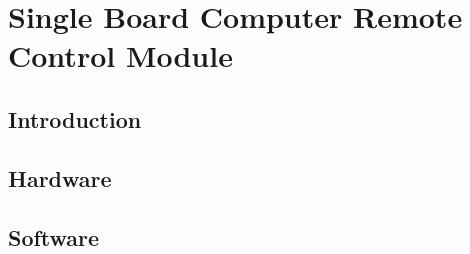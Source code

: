 \chapter{Single Board Computer Remote Control Module}

\section{Introduction}
\section{Hardware}
\section{Software}


